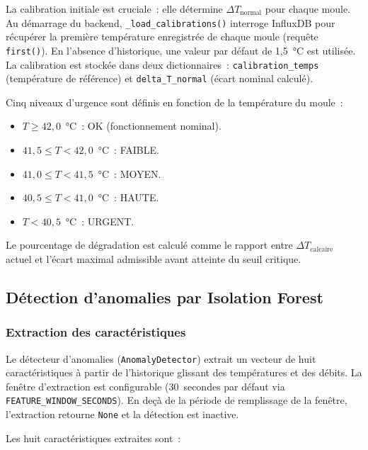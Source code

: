 La calibration initiale est cruciale~: elle détermine \(\Delta T_{\text{normal}}\) pour chaque moule. Au démarrage du backend, \texttt{\_load\_calibrations()} interroge InfluxDB pour récupérer la première température enregistrée de chaque moule (requête \texttt{first()}). En l'absence d'historique, une valeur par défaut de 1,5~\si{\celsius} est utilisée. La calibration est stockée dans deux dictionnaires~: \texttt{calibration\_temps} (température de référence) et \texttt{delta\_T\_normal} (écart nominal calculé).

Cinq niveaux d'urgence sont définis en fonction de la température du moule~:

\begin{itemize}
  \item \(T \geq 42,0\)~\si{\celsius}~: OK (fonctionnement nominal).
  \item \(41,5 \leq T < 42,0\)~\si{\celsius}~: FAIBLE.
  \item \(41,0 \leq T < 41,5\)~\si{\celsius}~: MOYEN.
  \item \(40,5 \leq T < 41,0\)~\si{\celsius}~: HAUTE.
  \item \(T < 40,5\)~\si{\celsius}~: URGENT.
\end{itemize}

Le pourcentage de dégradation est calculé comme le rapport entre \(\Delta T_{\text{calcaire}}\) actuel et l'écart maximal admissible avant atteinte du seuil critique.

\subsection{Détection d'anomalies par Isolation Forest}

\subsubsection{Extraction des caractéristiques}

Le détecteur d'anomalies (\texttt{AnomalyDetector}) extrait un vecteur de huit caractéristiques à partir de l'historique glissant des températures et des débits. La fenêtre d'extraction est configurable (30~secondes par défaut via \texttt{FEATURE\_WINDOW\_SECONDS}). En deçà de la période de remplissage de la fenêtre, l'extraction retourne \texttt{None} et la détection est inactive.

Les huit caractéristiques extraites sont~:

